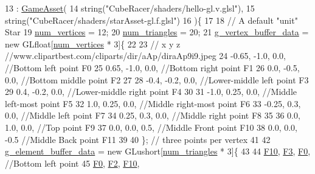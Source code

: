 \begin{DoxyCode}
13   : \hyperlink{classGameAsset_a9c96b0bafa2b6973a2e8c09bf51c52ec}{GameAsset}(
14       \textcolor{keywordtype}{string}(\textcolor{stringliteral}{"CubeRacer/shaders/hello-gl.v.glsl"}), 
15       \textcolor{keywordtype}{string}(\textcolor{stringliteral}{"CubeRacer/shaders/starAsset-gl.f.glsl"})
16 )\{
17 
18   \textcolor{comment}{// A default "unit" Star}
19   \hyperlink{classGameAsset_a3e8d7dc58d3d4efafbbce1536b78dbc7}{num\_vertices} = 12;
20   \hyperlink{classGameAsset_aae4d864335c2eca685cc86602881cd18}{num\_triangles} = 20;
21   \hyperlink{classGameAsset_ae1d682ecf84d9cd3f91a8c870acf2777}{g\_vertex\_buffer\_data} = \textcolor{keyword}{new} GLfloat[\hyperlink{classGameAsset_a3e8d7dc58d3d4efafbbce1536b78dbc7}{num\_vertices} * 3]\{
22 
23   \textcolor{comment}{//     x      y     z     //www.clipartbest.com/cliparts/dir/aAp/diraAp9i9.jpeg}
24     -0.65,  -1.0,    0.0,   \textcolor{comment}{//Bottom left point     F0}
25      0.65,  -1.0,    0.0,   \textcolor{comment}{//Bottom right point        F1}
26      0.0,   -0.5,    0.0,   \textcolor{comment}{//Bottom middle point       F2}
27     
28     -0.4,   -0.2,    0.0,   \textcolor{comment}{//Lower-middle left point   F3}
29      0.4,   -0.2,    0.0,   \textcolor{comment}{//Lower-middle right point  F4}
30 
31     -1.0,    0.25,   0.0,   \textcolor{comment}{//Middle left-most point    F5}
32      1.0,    0.25,   0.0,   \textcolor{comment}{//Middle right-most point   F6}
33     -0.25,   0.3,    0.0,   \textcolor{comment}{//Middle left point     F7}
34      0.25,   0.3,    0.0,   \textcolor{comment}{//Middle right point        F8}
35 
36      0.0,    1.0,    0.0,   \textcolor{comment}{//Top point         F9}
37      0.0,    0.0,    0.5,   \textcolor{comment}{//Middle Front point        F10}
38      0.0,    0.0,   -0.5    \textcolor{comment}{//Middle Back point     F11 }
39     
40 \}; \textcolor{comment}{// three points per vertex}
41 
42   \hyperlink{classGameAsset_ab859393c9158c8bda39cd100475fee25}{g\_element\_buffer\_data} = \textcolor{keyword}{new} GLushort[\hyperlink{classGameAsset_aae4d864335c2eca685cc86602881cd18}{num\_triangles} * 3]\{
43 
44     \hyperlink{classStarAsset_a39ac8e905b1e0d2eba0b5c27cd223cefae5472cbbc494096850a67cd767b7aebb}{F10}, \hyperlink{classStarAsset_a39ac8e905b1e0d2eba0b5c27cd223cefa0d9d6c5db831f400fb3137b01aaa7f6d}{F3},  \hyperlink{classStarAsset_a39ac8e905b1e0d2eba0b5c27cd223cefaadcb919baa5887d4a379bdce37833efe}{F0},    \textcolor{comment}{//Bottom left point}
45     \hyperlink{classStarAsset_a39ac8e905b1e0d2eba0b5c27cd223cefaadcb919baa5887d4a379bdce37833efe}{F0},  \hyperlink{classStarAsset_a39ac8e905b1e0d2eba0b5c27cd223cefae935994103227f6914fd7479331c156a}{F2},  \hyperlink{classStarAsset_a39ac8e905b1e0d2eba0b5c27cd223cefae5472cbbc494096850a67cd767b7aebb}{F10},

\end{DoxyCode}

